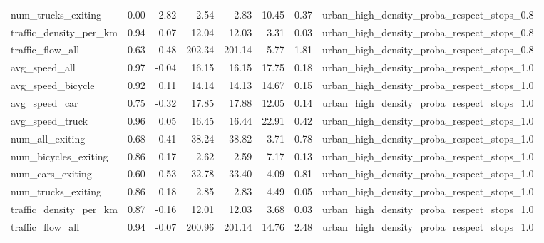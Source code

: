 \begin{table}[ht]
\begin{tabular}{lrrrrrrl}
  num\_trucks\_exiting & 0.00 & -2.82 & 2.54 & 2.83 & 10.45 & 0.37 & urban\_high\_density\_proba\_respect\_stops\_0.8 \\ 
  traffic\_density\_per\_km & 0.94 & 0.07 & 12.04 & 12.03 & 3.31 & 0.03 & urban\_high\_density\_proba\_respect\_stops\_0.8 \\ 
  traffic\_flow\_all & 0.63 & 0.48 & 202.34 & 201.14 & 5.77 & 1.81 & urban\_high\_density\_proba\_respect\_stops\_0.8 \\ 
  avg\_speed\_all & 0.97 & -0.04 & 16.15 & 16.15 & 17.75 & 0.18 & urban\_high\_density\_proba\_respect\_stops\_1.0 \\ 
  avg\_speed\_bicycle & 0.92 & 0.11 & 14.14 & 14.13 & 14.67 & 0.15 & urban\_high\_density\_proba\_respect\_stops\_1.0 \\ 
  avg\_speed\_car & 0.75 & -0.32 & 17.85 & 17.88 & 12.05 & 0.14 & urban\_high\_density\_proba\_respect\_stops\_1.0 \\ 
  avg\_speed\_truck & 0.96 & 0.05 & 16.45 & 16.44 & 22.91 & 0.42 & urban\_high\_density\_proba\_respect\_stops\_1.0 \\ 
  num\_all\_exiting & 0.68 & -0.41 & 38.24 & 38.82 & 3.71 & 0.78 & urban\_high\_density\_proba\_respect\_stops\_1.0 \\ 
  num\_bicycles\_exiting & 0.86 & 0.17 & 2.62 & 2.59 & 7.17 & 0.13 & urban\_high\_density\_proba\_respect\_stops\_1.0 \\ 
  num\_cars\_exiting & 0.60 & -0.53 & 32.78 & 33.40 & 4.09 & 0.81 & urban\_high\_density\_proba\_respect\_stops\_1.0 \\ 
  num\_trucks\_exiting & 0.86 & 0.18 & 2.85 & 2.83 & 4.49 & 0.05 & urban\_high\_density\_proba\_respect\_stops\_1.0 \\ 
  traffic\_density\_per\_km & 0.87 & -0.16 & 12.01 & 12.03 & 3.68 & 0.03 & urban\_high\_density\_proba\_respect\_stops\_1.0 \\ 
  traffic\_flow\_all & 0.94 & -0.07 & 200.96 & 201.14 & 14.76 & 2.48 & urban\_high\_density\_proba\_respect\_stops\_1.0 \\ 
   \hline
\end{tabular}
\end{table}
